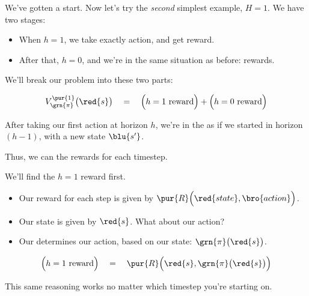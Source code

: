         We've gotten a start. Now let's try the \textit{second} simplest example, $H=1$. We have two stages:

        \begin{itemize}
            \item When $h=1$, we take exactly  action, and get  reward. 
            \item After that, $h=0$, and we're in the same situation as before:  rewards.
        \end{itemize}

        We'll break our problem into these two parts:

        \begin{equation}
            V_{\grn{\pi}}^{\pur{1}}\big(\red{s} \big) \quad=\quad 
            \Big(h=1 \text{ reward}\Big)
            + 
            \Big(h=0 \text{ reward}\Big)
        \end{equation}

        \begin{concept}
            After taking our first action at horizon $h$, we're in the  as if we started in horizon $(h-1)$, with a new state $\blu{s'}$.

            Thus, we can  the rewards for each timestep.
        \end{concept}

        We'll find the $h=1$ reward first.

        \begin{itemize}
            \item Our reward for each step is given by $\pur{R} \Big( \red{state},\bro{action} \Big)$.
            \item Our state is given by $\red{s}$. What about our action?
            \item Our  determines our action, based on our state: $\grn{\pi} \big(\red{s} \big)$.
        \end{itemize}

        \begin{equation}
            \Big(h=1 \text{ reward}\Big) \quad=\quad 
            \pur{R} \Big( \red{s},\grn{\pi}\big(\red{s}\big) \Big)
        \end{equation}

        This same reasoning works no matter which timestep you're starting on.\\


